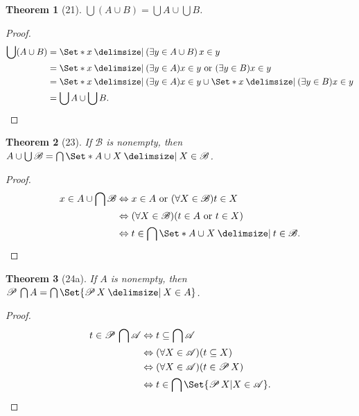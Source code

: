 \documentclass[12pt]{article}
\theoremstyle{plain}
\newtheorem*{exthm}{Theorem}
\theoremstyle{remark}
\theoremstyle{definition}
\theoremstyle{remark}
\newcommand{\powerset}{\mathscr{P}\,}
\providecommand\st{}
\newcommand\SetSymbol[1][]{%
  \nonscript\:#1\vert%
  \allowbreak%
  \nonscript\:
\mathopen{}}
\renewcommand\st{\SetSymbol[\delimsize]}
\renewcommand{\iff}{\Leftrightarrow}
\begin{document}
\begin{exthm}[21]
  $\bigcup (A \cup B) = \bigcup A \cup \bigcup B$.
\end{exthm}
\begin{proof}
  \begin{align*}
    \bigcup (A \cup B) &= \Set*{x \st (\exists y \in A \cup B)\, x \in y}\\
                       &= \Set*{x \st (\exists y \in A)x \in y \text{ or } (\exists y \in B) x \in y}\\
                       &= \Set*{x \st (\exists y \in A)x \in y} \cup \Set*{x \st (\exists y \in B) x \in y}\\
                       &= \bigcup A \cup \bigcup B.
  \end{align*}
\end{proof}

\begin{exthm}[23]
  If $\mathscr{B}$ is nonempty, then $A \cup \bigcup \mathscr{B} = \bigcap \Set*{A \cup X \st X \in \mathscr{B}}$.
\end{exthm}
\begin{proof}
  \begin{align*}
    x \in A \cup \bigcap \mathscr{B} &\iff x \in A \text{ or } (\forall X \in \mathscr{B}) t \in X\\
                                     &\iff (\forall X \in \mathscr{B}) (t \in A \text{ or } t \in X)\\
                                     &\iff t \in \bigcap\Set*{A \cup X \st t \in \mathscr{B}}.
  \end{align*}
\end{proof}

\begin{exthm}[24a]
  If $A$ is nonempty, then $\powerset \bigcap A = \bigcap \Set{\powerset X \st X \in A}$.
\end{exthm}
\begin{proof}
  \begin{align*}
    t \in \powerset \bigcap \mathscr{A} &\iff t \subseteq \bigcap \mathscr{A}\\
                                        &\iff (\forall X \in \mathscr{A}) (t \subseteq X)\\
                                        &\iff (\forall X \in \mathscr{A}) (t \in \powerset X)\\
                                        &\iff t \in \bigcap \Set{\powerset X | X \in \mathscr{A}}.
  \end{align*}
\end{proof}
\end{document}
